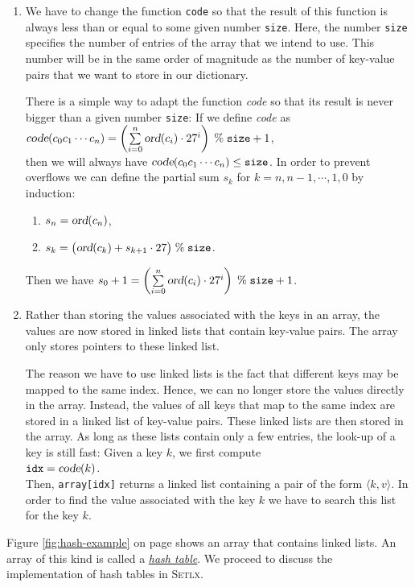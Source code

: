 \begin{enumerate}
\item We have to change the function  \texttt{code} so that the result of this function is always
      less than or equal to some given number \texttt{size}.  Here, the number \texttt{size} specifies
      the number of entries of the array that we intend to use.  This number will be in the same
      order of magnitude as the number of key-value pairs that we want to store in our dictionary.

      There is a simple way to adapt the function  \textsl{code} so that its result is never bigger
      than a given number \texttt{size}: If we define \textsl{code} as
      \\[0.2cm]
      \hspace*{1.3cm} 
      $\textsl{code}(c_0c_1\cdots c_n) = \left(\sum\limits_{i=0}^n \textsl{ord}(c_i) \cdot
        27^i\right) \;\%\; \texttt{size} + 1$,
      \\[0.2cm]
      then we will always have $\textsl{code}(c_0c_1\cdots c_n) \leq \mathtt{size}$.  In order to
      prevent overflows we can define the partial sum $s_k$ for  $k=n,n-1,\cdots,1,0$ by induction:
      \begin{enumerate}
      \item $s_n = \textsl{ord}(c_n)$,
      \item $s_{k} = \bigl(\textsl{ord}(c_{k}) + s_{k+1} \cdot 27 \bigr) \;\%\; \texttt{size}$.
      \end{enumerate}
      Then we have
      \hspace*{1.3cm} 
      $s_0 + 1 = \left(\sum\limits_{i=0}^n \textsl{ord}(c_i) \cdot 27^i\right) \;\%\; \texttt{size} + 1$.
\item Rather than storing the values associated with the keys in an array, the values are now stored
      in linked lists that contain key-value pairs.  The array only stores pointers to these linked list.
      
      The reason we have to use linked lists is the fact that different keys may be mapped to the
      same index.  Hence, we can no longer store the values directly in the array.  Instead,
      the values of all keys that map to the same index are stored in a
      linked list of key-value pairs.  These linked lists are then stored in the array.  As long as
      these lists contain only a few entries, the look-up of a key is still fast: Given a key $k$,
      we first compute 
      \\[0.2cm]
      \hspace*{1.3cm}
      $\mathtt{idx} = \textsl{code}(k)$.
      \\[0.2cm]
      Then, \texttt{array[idx]} returns a linked list containing a pair of the form $\langle k, v \rangle$.
      In order to find the value associated with the key $k$ we have to search this list for the key
      $k$.
\end{enumerate}
Figure \ref{fig:hash-example} on page \pageref{fig:hash-example} shows an array that contains
linked lists.  An array of this kind is called a
\href{https://en.wikipedia.org/wiki/Hash_table}{\emph{hash table}}.
We proceed to discuss the implementation of hash tables in \textsc{Setlx}.



